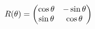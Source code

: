 \documentclass[preview]{standalone}
\begin{document}
\begin{align*}
\special{dvisvgm:raw <g id='unique000'>}R(\theta) = \begin{pmatrix} \cos\theta & -\sin\theta \\ \sin\theta & \cos\theta \end{pmatrix}\special{dvisvgm:raw </g>}
\end{align*}
\end{document}
